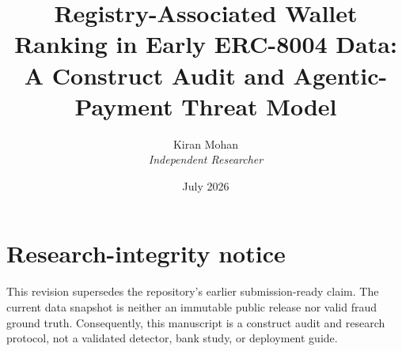 \documentclass[11pt,a4paper]{article}
\title{Registry-Associated Wallet Ranking in Early ERC-8004 Data:\\
A Construct Audit and Agentic-Payment Threat Model}
\author{Kiran Mohan\\\textit{Independent Researcher}}
\date{July 2026}
\begin{document}
\maketitle

\noindent{}
\medskip












\section*{Research-integrity notice}
This revision supersedes the repository's earlier submission-ready claim.
The current data snapshot is neither an immutable public release nor valid
fraud ground truth.  Consequently, this manuscript is a construct audit and
research protocol, not a validated detector, bank study, or deployment guide.




\appendix



\end{document}
